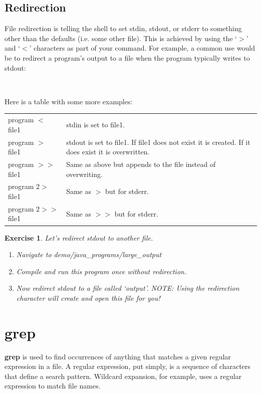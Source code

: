 \documentclass[oneside]{book}
\newcommand{\commandline}[1]{\begin{center} \colorbox{Dark}{\textcolor{white}{#1}} \end{center}}
\newtheorem{ex}{Exercise}[chapter]
\begin{document}
    \subsection{Redirection}
        File redirection is telling the shell to set stdin, stdout, or stderr to something other than the defaults (i.e. some other file). This is achieved by using the `$>$' and `$<$' characters as part of your command. For example, a common use would be to redirect a program's output to a file when the program typically writes to stdout:
        \commandline{java HelloWold.java $>$ output.txt}
        \vspace{0.3cm}
        Here is a table with some more examples:
        \begin{center}
            \begin{tabular}{|l|l|}
                 \hline
                 program $<$ file1 & stdin is set to file1. \\
                 program $>$ file1 & stdout is set to file1. If file1 does not exist it is created. If it does exist it is overwritten. \\
                 program $>>$ file1 & Same as above but appends to the file instead of overwriting. \\
                 program $2>$ file1 & Same as $>$ but for stderr. \\
                 program $2>>$ file1 & Same as $>>$ but for stderr. \\ \hline
            \end{tabular}
        \end{center}
        
        \vspace{0.5cm}

    \begin{ex} Let's redirect stdout to another file.
        \begin{enumerate}
            \item Navigate to demo/java\_programs/large\_output
            \item Compile and run this program once without redirection.
            \item Now redirect stdout to a file called `output'. NOTE: Using the redirection character will create and open this file for you!
        \end{enumerate}
    \end{ex}

\section{grep}
\textbf{grep} is used to find occurrences of anything that matches a given regular expression in a file. A regular expression, put simply, is a sequence of characters that define a search pattern. Wildcard expansion, for example, uses a regular expression to match file names.
\end{document}
